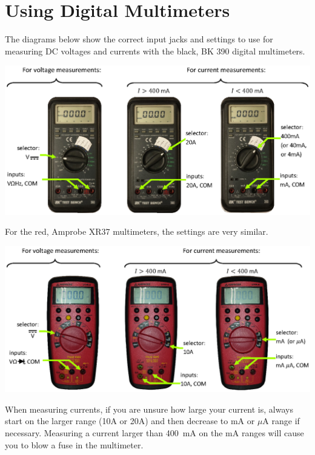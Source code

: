 \section{Using Digital Multimeters}
\label{digital_multimeters}

The diagrams below show the correct input jacks and settings to use 
for measuring DC voltages and currents 
with the black, BK 390 digital multimeters.

\includegraphics[width=\textwidth]{appendices/digital_multimeters/dmm_figs_bk390.eps}

\vspace{\fill}
For the red, Amprobe XR37 multimeters, the settings are very similar.

\includegraphics[width=\textwidth]{appendices/digital_multimeters/dmm_figs_xr37.eps}

\vspace{\fill}
When measuring currents, if you are unsure how large your current is, always start 
on the larger range (10A or 20A) and then decrease to mA or $\mu$A range if necessary.
Measuring a current larger than 400~mA on the mA ranges will cause you to blow a fuse in the multimeter.
